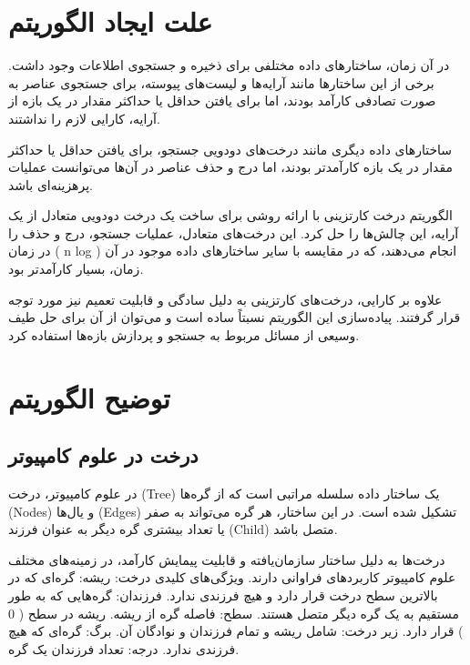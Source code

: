 \documentclass{article}
\begin{document}
\section{علت ایجاد الگوریتم}
در آن زمان، ساختارهای داده مختلفی برای ذخیره و جستجوی اطلاعات وجود داشت. برخی از این ساختارها مانند آرایه‌ها و لیست‌های پیوسته، برای جستجوی عناصر به صورت تصادفی کارآمد بودند، اما برای یافتن حداقل یا حداکثر مقدار در یک بازه از آرایه، کارایی لازم را نداشتند.

ساختارهای داده دیگری مانند درخت‌های دودویی جستجو، برای یافتن حداقل یا حداکثر مقدار در یک بازه کارآمدتر بودند، اما درج و حذف عناصر در آن‌ها می‌توانست عملیات پرهزینه‌ای باشد.

الگوریتم درخت کارتزینی با ارائه روشی برای ساخت یک درخت دودویی متعادل از یک آرایه، این چالش‌ها را حل کرد. این درخت‌های متعادل، عملیات جستجو، درج و حذف را در زمان ( n log ) انجام می‌دهند، که در مقایسه با سایر ساختارهای داده موجود در آن زمان، بسیار کارآمدتر بود.

علاوه بر کارایی، درخت‌های کارتزینی به دلیل سادگی و قابلیت تعمیم نیز مورد توجه قرار گرفتند. پیاده‌سازی این الگوریتم نسبتاً ساده است و می‌توان از آن برای حل طیف وسیعی از مسائل مربوط به جستجو و پردازش بازه‌ها استفاده کرد.

\section{توضیح الگوریتم}
\subsection{درخت در علوم کامپیوتر}
در علوم کامپیوتر، درخت (Tree) یک ساختار داده سلسله مراتبی است که از گره‌ها (Nodes) و یال‌ها (Edges) تشکیل شده است. در این ساختار، هر گره می‌تواند به صفر یا تعداد بیشتری گره دیگر به عنوان فرزند (Child) متصل باشد.

درخت‌ها به دلیل ساختار سازمان‌یافته و قابلیت پیمایش کارآمد، در زمینه‌های مختلف علوم کامپیوتر کاربردهای فراوانی دارند.
\newline ویژگی‌های کلیدی درخت:
\newline ریشه: گره‌ای که در بالاترین سطح درخت قرار دارد و هیچ فرزندی ندارد.
\newline فرزندان: گره‌هایی که به طور مستقیم به یک گره دیگر متصل هستند.
\newline سطح: فاصله گره از ریشه. ریشه در سطح ( 0 ) قرار دارد.
\newline زیر درخت: شامل ریشه و تمام فرزندان و نوادگان آن.
\newline برگ: گره‌ای که هیچ فرزندی ندارد.
\newline درجه: تعداد فرزندان یک گره.
\end{document}
